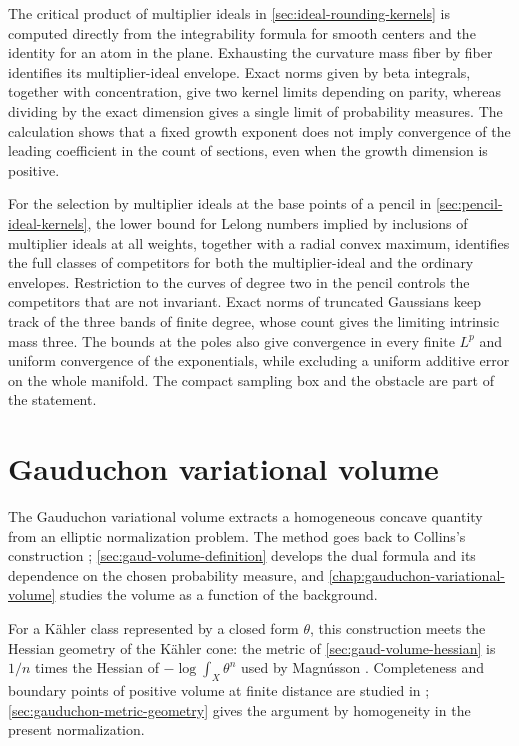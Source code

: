 The critical product of multiplier ideals in \cref{sec:ideal-rounding-kernels} is computed directly from the integrability formula for smooth centers and the identity for an atom in the plane. Exhausting the curvature mass fiber by fiber identifies its multiplier-ideal envelope. Exact norms given by beta integrals, together with concentration, give two kernel limits depending on parity, whereas dividing by the exact dimension gives a single limit of probability measures. The calculation shows that a fixed growth exponent does not imply convergence of the leading coefficient in the count of sections, even when the growth dimension is positive.

For the selection by multiplier ideals at the base points of a pencil in \cref{sec:pencil-ideal-kernels}, the lower bound for Lelong numbers implied by inclusions of multiplier ideals at all weights, together with a radial convex maximum, identifies the full classes of competitors for both the multiplier-ideal and the ordinary envelopes. Restriction to the curves of degree two in the pencil controls the competitors that are not invariant. Exact norms of truncated Gaussians keep track of the three bands of finite degree, whose count gives the limiting intrinsic mass three. The bounds at the poles also give convergence in every finite $L^p$ and uniform convergence of the exponentials, while excluding a uniform additive error on the whole manifold. The compact sampling box and the obstacle are part of the statement.

\section{Gauduchon variational volume}
\label{sec:history-gaud-volume}

The Gauduchon variational volume extracts a homogeneous concave quantity from an elliptic normalization problem. The method goes back to Collins's construction \cite[Theorem~2.13, pp.~1068--1069]{Collins21}; \cref{sec:gaud-volume-definition} develops the dual formula and its dependence on the chosen probability measure, and \cref{chap:gauduchon-variational-volume} studies the volume as a function of the background.

For a K\"ahler class represented by a closed form $\theta$, this construction meets the Hessian geometry of the K\"ahler cone: the metric of \cref{sec:gaud-volume-hessian} is $1/n$ times the Hessian of $-\log\int_X\theta^n$ used by Magn{\'u}sson \cite[v1, Section~1, pp.~2--4]{Magnusson12}. Completeness and boundary points of positive volume at finite distance are studied in \cite[v1, Proposition~4.4 and Lemma~4.5, p.~11]{Magnusson12}; \cref{sec:gauduchon-metric-geometry} gives the argument by homogeneity in the present normalization.

